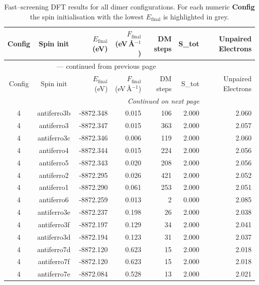 
\begin{longtable}{@{}ccrrrrr@{}}
\caption{Fast–screening DFT results for all dimer configurations.
         For each numeric \textbf{Config} the spin initialisation with the
         lowest $E_{\mathrm{final}}$ is highlighted in grey.}\label{tab:dimer_full}\\
\toprule
Config & Spin init & $E_{\mathrm{final}}$ (eV) &
$F_{\mathrm{final}}$ (eV\,\AA$^{-1}$) & DM steps & S_{tot} & Unpaired Electrons\\
\midrule
\endfirsthead
\multicolumn{6}{c}{{\tablename}~\thetable{} — continued from previous page}\\
\toprule
Config & Spin init & $E_{\mathrm{final}}$ (eV) &
$F_{\mathrm{final}}$ (eV\,\AA$^{-1}$) & DM steps & S_{tot} & Unpaired Electrons\\
\midrule
\endhead
\midrule
\multicolumn{6}{r}{\emph{Continued on next page}}\\
\endfoot
\bottomrule
\endlastfoot
\rowcolor{gray!20} 4 & antiferro3b & -8872.348 & 0.015 & 106 & 2.000 & 2.060 \\
4 & antiferro3 & -8872.347 & 0.015 & 363 & 2.000 & 2.057 \\
4 & antiferro3c & -8872.346 & 0.006 & 119 & 2.000 & 2.060 \\
4 & antiferro4 & -8872.344 & 0.015 & 224 & 2.000 & 2.056 \\
4 & antiferro5 & -8872.343 & 0.020 & 208 & 2.000 & 2.056 \\
4 & antiferro2 & -8872.295 & 0.026 & 421 & 2.000 & 2.052 \\
4 & antiferro1 & -8872.290 & 0.061 & 253 & 2.000 & 2.051 \\
4 & antiferro6 & -8872.259 & 0.013 & 2 & 0.000 & 2.085 \\
4 & antiferro3e & -8872.237 & 0.198 & 26 & 2.000 & 2.038 \\
4 & antiferro3f & -8872.197 & 0.129 & 34 & 2.000 & 2.041 \\
4 & antiferro3d & -8872.194 & 0.123 & 31 & 2.000 & 2.037 \\
4 & antiferro7d & -8872.120 & 0.623 & 15 & 2.000 & 2.018 \\
4 & antiferro7f & -8872.120 & 0.623 & 15 & 2.000 & 2.018 \\
4 & antiferro7e & -8872.084 & 0.528 & 13 & 2.000 & 2.021 \\
\end{longtable}
